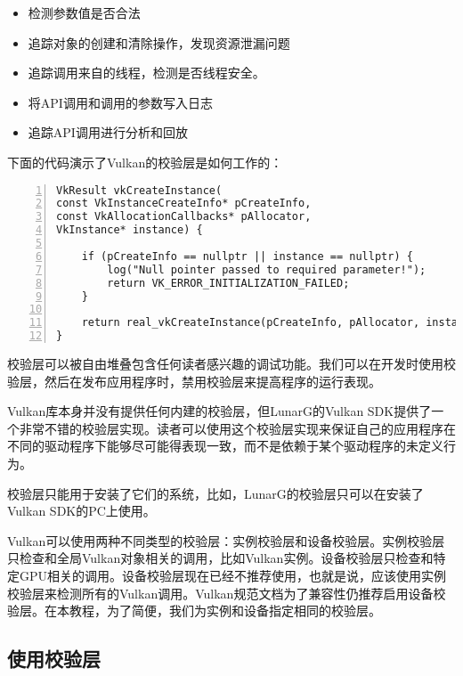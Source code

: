 \documentclass{ctexart}
\begin{document}
\begin{itemize}
	\item 检测参数值是否合法
	\item 追踪对象的创建和清除操作，发现资源泄漏问题
	\item 追踪调用来自的线程，检测是否线程安全。
	\item 将API调用和调用的参数写入日志
	\item 追踪API调用进行分析和回放
\end{itemize}

下面的代码演示了Vulkan的校验层是如何工作的：

\begin{lstlisting}[language={[ANSI]C},keywordstyle=\color{blue!70},commentstyle=\color{red!50!green!50!blue!50},frame=shadowbox, rulesepcolor=\color{red!20!green!20!blue!20},basicstyle=\small,numbers=left, numberstyle=\tiny,breaklines=true]
VkResult vkCreateInstance(
const VkInstanceCreateInfo* pCreateInfo,
const VkAllocationCallbacks* pAllocator,
VkInstance* instance) {

	if (pCreateInfo == nullptr || instance == nullptr) {
		log("Null pointer passed to required parameter!");
		return VK_ERROR_INITIALIZATION_FAILED;
	}

	return real_vkCreateInstance(pCreateInfo, pAllocator, instance);
}
\end{lstlisting}

校验层可以被自由堆叠包含任何读者感兴趣的调试功能。我们可以在开发时使用校验层，然后在发布应用程序时，禁用校验层来提高程序的运行表现。

Vulkan库本身并没有提供任何内建的校验层，但LunarG的Vulkan SDK提供了一个非常不错的校验层实现。读者可以使用这个校验层实现来保证自己的应用程序在不同的驱动程序下能够尽可能得表现一致，而不是依赖于某个驱动程序的未定义行为。

校验层只能用于安装了它们的系统，比如，LunarG的校验层只可以在安装了Vulkan SDK的PC上使用。

Vulkan可以使用两种不同类型的校验层：实例校验层和设备校验层。实例校验层只检查和全局Vulkan对象相关的调用，比如Vulkan实例。设备校验层只检查和特定GPU相关的调用。设备校验层现在已经不推荐使用，也就是说，应该使用实例校验层来检测所有的Vulkan调用。Vulkan规范文档为了兼容性仍推荐启用设备校验层。在本教程，为了简便，我们为实例和设备指定相同的校验层。

\subsection{使用校验层}
\end{document}
